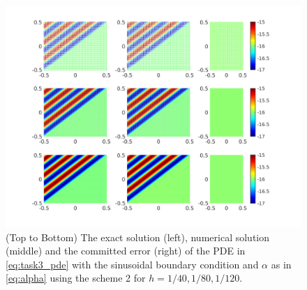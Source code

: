 \documentclass[10pt,a4paper,twoside, french]{article}
\numberwithin{equation}{section}
\numberwithin{figure}{section}
\numberwithin{table}{section}
\begin{document}
\begin{enumerate}
\begin{enumerate}[a.]
\begin{figure}[h]
\includegraphics[scale=.8]{fig/task3_scheme2_a10_N_40_80_120}
\caption{(Top to Bottom) The exact solution (left), numerical solution (middle) and the committed error (right) of the PDE in \eqref{eq:task3_pde} with the sinusoidal boundary condition and $\alpha$ as in \eqref{eq:alpha} using the scheme 2 for $h = 1/40, 1/80, 1/120$.}
\label{fig:task3_scheme2_alpha01}
\end{figure}


\end{enumerate}


\end{enumerate}
	
	
	
	
\end{document}
